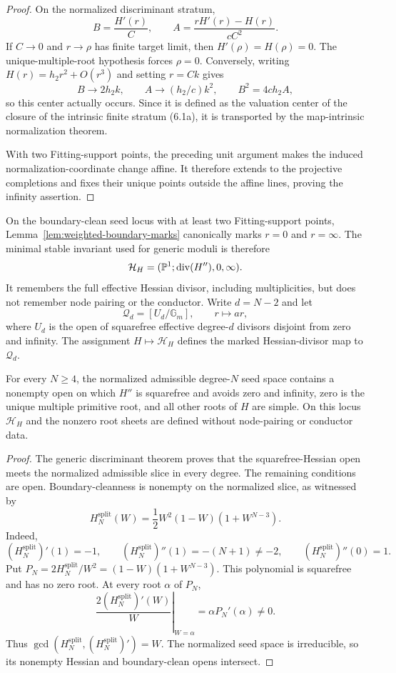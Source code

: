 \begin{proof}
On the normalized discriminant stratum,
\[
 B=\frac{H'(r)}C,
 \qquad
 A=\frac{rH'(r)-H(r)}{cC^2}.                           \tag{6.2a}
\]
If $C\to0$ and $r\to\rho$ has finite target limit, then
$H'(\rho)=H(\rho)=0$.  The unique-multiple-root hypothesis forces
$\rho=0$.  Conversely, writing $H(r)=h_2r^2+O(r^3)$ and setting $r=Ck$
gives
\[
 B\to2h_2k,
 \qquad A\to(h_2/c)k^2,
 \qquad B^2=4ch_2A,                                   \tag{6.2b}
\]
so this center actually occurs.  Since it is defined as the valuation center
of the closure of the intrinsic finite stratum (6.1a), it is transported by
the map-intrinsic normalization theorem.

With two Fitting-support points, the preceding unit argument makes the
induced normalization-coordinate change affine.  It therefore extends to
the projective completions and fixes their unique points outside the affine
lines, proving the infinity assertion.
\end{proof}

On the boundary-clean seed locus with at least two Fitting-support points,
Lemma~\ref{lem:weighted-boundary-marks} canonically marks $r=0$ and
$r=\infty$.  The minimal
stable invariant used for generic moduli is therefore
\[
 \mathcal H_H=(\P^1;\operatorname{div}(H''),0,\infty).
\]
It remembers the full effective Hessian divisor, including multiplicities,
but does not remember node pairing or the conductor.  Write $d=N-2$ and let
\[
 \mathcal Q_d=[U_d/\mathbb G_m],\qquad r\longmapsto ar,
\]
where $U_d$ is the open of squarefree effective degree-$d$ divisors disjoint
from zero and infinity.  The assignment $H\mapsto\mathcal H_H$ defines the
marked Hessian-divisor map to $\mathcal Q_d$.

\begin{proposition}
\label{prop:ordinary-boundary-clean}
For every $N\ge4$, the normalized admissible degree-$N$ seed space contains
a nonempty open on which $H''$ is squarefree and avoids zero and infinity,
zero is the unique multiple primitive root, and all other roots of $H$ are
simple.  On this locus $\mathcal H_H$ and the nonzero root sheets are defined
without node-pairing or conductor data.
\end{proposition}

\begin{proof}
The generic discriminant theorem proves that the squarefree-Hessian open
meets the normalized admissible slice in every degree.  The remaining
conditions are open.  Boundary-cleanness is nonempty on the normalized slice,
as witnessed by
\[
 H_N^{\mathrm{split}}(W)=\frac12W^2(1-W)(1+W^{N-3}).
\]
Indeed,
\[
 (H_N^{\mathrm{split}})'(1)=-1,\qquad
 (H_N^{\mathrm{split}})''(1)=-(N+1)\ne-2,\qquad
 (H_N^{\mathrm{split}})''(0)=1.
\]
Put $P_N=2H_N^{\mathrm{split}}/W^2=(1-W)(1+W^{N-3})$.
This polynomial is squarefree and has no zero root.  At every root $\alpha$
of $P_N$,
\[
 \left.\frac{2(H_N^{\mathrm{split}})'(W)}W\right|_{W=\alpha}
 =\alpha P_N'(\alpha)\ne0.
\]
Thus $\gcd(H_N^{\mathrm{split}},(H_N^{\mathrm{split}})')=W$.
The normalized seed space is irreducible, so its nonempty Hessian and
boundary-clean opens intersect.
\end{proof}

